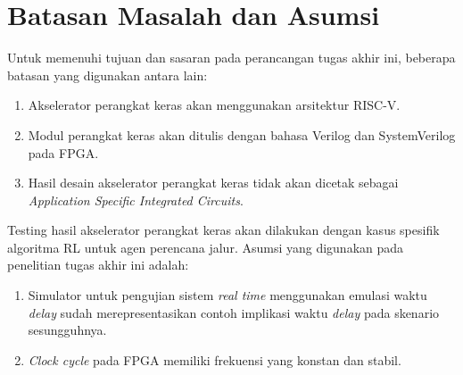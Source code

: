 \section{Batasan Masalah dan Asumsi}
\label{sec:batasan-masalah}

Untuk memenuhi tujuan dan sasaran pada perancangan tugas akhir ini, beberapa batasan yang digunakan antara lain:

\begin{enumerate}
	\item Akselerator perangkat keras akan menggunakan arsitektur RISC-V.
	\item Modul perangkat keras akan ditulis dengan bahasa Verilog dan SystemVerilog pada \ac{FPGA}.
	\item Hasil desain akselerator perangkat keras tidak akan dicetak sebagai \textit{Application Specific Integrated Circuits}.
\end{enumerate}

Testing hasil akselerator perangkat keras akan dilakukan dengan kasus spesifik algoritma \ac{RL} untuk agen perencana jalur. Asumsi yang digunakan pada penelitian tugas akhir ini adalah:

\begin{enumerate}
	\item Simulator untuk pengujian sistem \textit{real time} menggunakan emulasi waktu \textit{delay} sudah merepresentasikan contoh implikasi waktu \textit{delay} pada skenario sesungguhnya.
	\item \textit{Clock cycle} pada FPGA memiliki frekuensi yang konstan dan stabil.
\end{enumerate}
